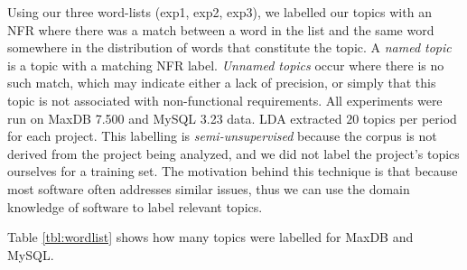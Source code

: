 \documentclass[smallextended]{svjour3}       %
\begin{document}
Using our three word-lists (\textsf{exp1}, \textsf{exp2}, \textsf{exp3}), we labelled our topics with an NFR where there was a match between a word in the list and the same word somewhere in the distribution of words that constitute the topic.
A \emph{named topic} is a topic with a matching NFR label. \emph{Unnamed
topics} occur where there is no such match, which may indicate either a lack of precision, or simply that this topic is not associated with non-functional requirements.
All experiments were run on MaxDB 7.500 and MySQL 3.23 data. LDA
extracted $20$ topics per period for each project.
This labelling is \emph{semi-unsupervised} because the corpus is not derived from 
the project being analyzed, and we did not label the project's topics
ourselves for a training set. The motivation behind this technique is that
because most software often addresses similar issues, thus we can use the
domain knowledge of software to label relevant topics.

Table \ref{tbl:wordlist} shows how many topics were labelled for MaxDB
and MySQL.
\end{document}
